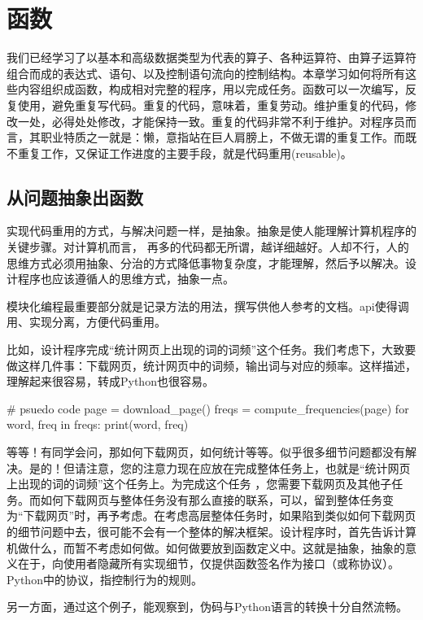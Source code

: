 \chapter{函数}
我们已经学习了以基本和高级数据类型为代表的算子、各种运算符、由算子运算符组合而成的表达式、语句、以及控制语句流向的控制结构。本章学习如何将所有这些内容组织成函数，构成相对完整的程序，用以完成任务。函数可以一次编写，反复使用，避免重复写代码。重复的代码，意味着，重复劳动。维护重复的代码，修改一处，必得处处修改，才能保持一致。重复的代码非常不利于维护。对程序员而言，其职业特质之一就是：懒，意指站在巨人肩膀上，不做无谓的重复工作。而既不重复工作，又保证工作进度的主要手段，就是代码重用(reusable)。

\section{从问题抽象出函数}
实现代码重用的方式，与解决问题一样，是抽象。抽象是使人能理解计算机程序的关键步骤。对计算机而言， 再多的代码都无所谓，越详细越好。人却不行，人的思维方式必须用抽象、分治的方式降低事物复杂度，才能理解，然后予以解决。设计程序也应该遵循人的思维方式，抽象一点。

模块化编程最重要部分就是记录方法的用法，撰写供他人参考的文档。api使得调用、实现分离，方便代码重用。

比如，设计程序完成“统计网页上出现的词的词频”这个任务。我们考虑下，大致要做这样几件事：下载网页，统计网页中的词频，输出词与对应的频率。这样描述，理解起来很容易，转成Python也很容易。
\begin{python}
  # psuedo code
  page = download_page()
  freqs = compute_frequencies(page)
  for word, freq in freqs:
      print(word, freq)
\end{python}
等等！有同学会问，那如何下载网页，如何统计等等。似乎很多细节问题都没有解决。是的！但请注意，您的注意力现在应放在完成整体任务上，也就是“统计网页上出现的词的词频”这个任务上。为完成这个任务 ，您需要下载网页及其他子任务。而如何下载网页与整体任务没有那么直接的联系，可以，留到整体任务变为“下载网页”时，再予考虑。在考虑高层整体任务时，如果陷到类似如何下载网页的细节问题中去，很可能不会有一个整体的解决框架。设计程序时，首先告诉计算机做什么，而暂不考虑如何做。如何做要放到函数定义中。这就是抽象，抽象的意义在于，向使用者隐藏所有实现细节，仅提供函数签名作为接口（或称协议）。Python中的协议，指控制行为的规则。

另一方面，通过这个例子，能观察到，伪码与Python语言的转换十分自然流畅。

